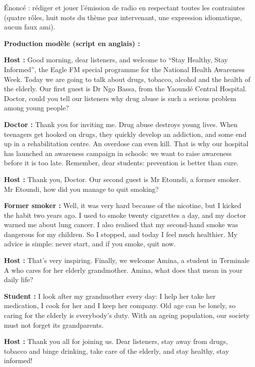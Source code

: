 \documentclass[11pt]{article}
\begin{document}
\begin{exoresolu}
Énoncé : rédiger et jouer l'émission de radio en respectant toutes les contraintes (quatre rôles, huit mots du thème par intervenant, une expression idiomatique, aucun faux ami).

\tcblower

\textbf{Production modèle (script en anglais) :}

\textbf{Host :} Good morning, dear listeners, and welcome to “Stay Healthy, Stay Informed”, the Eagle FM special programme for the National Health Awareness Week. Today we are going to talk about drugs, tobacco, alcohol and the health of the elderly. Our first guest is Dr Ngo Bassa, from the Yaoundé Central Hospital. Doctor, could you tell our listeners why drug abuse is such a serious problem among young people?

\textbf{Doctor :} Thank you for inviting me. Drug abuse destroys young lives. When teenagers get hooked on drugs, they quickly develop an addiction, and some end up in a rehabilitation centre. An overdose can even kill. That is why our hospital has launched an awareness campaign in schools: we want to raise awareness before it is too late. Remember, dear students: prevention is better than cure.

\textbf{Host :} Thank you, Doctor. Our second guest is Mr Etoundi, a former smoker. Mr Etoundi, how did you manage to quit smoking?

\textbf{Former smoker :} Well, it was very hard because of the nicotine, but I kicked the habit two years ago. I used to smoke twenty cigarettes a day, and my doctor warned me about lung cancer. I also realised that my second-hand smoke was dangerous for my children. So I stopped, and today I feel much healthier. My advice is simple: never start, and if you smoke, quit now.

\textbf{Host :} That's very inspiring. Finally, we welcome Amina, a student in Terminale A who cares for her elderly grandmother. Amina, what does that mean in your daily life?

\textbf{Student :} I look after my grandmother every day: I help her take her medication, I cook for her and I keep her company. Old age can be lonely, so caring for the elderly is everybody's duty. With an ageing population, our society must not forget its grandparents.

\textbf{Host :} Thank you all for joining us. Dear listeners, stay away from drugs, tobacco and binge drinking, take care of the elderly, and stay healthy, stay informed!


\end{exoresolu}
\end{document}
